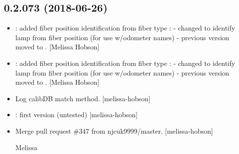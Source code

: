 \documentclass[a4paper,10pt,english]{report}
\begin{document}
\subsection{0.2.073 (2018-06-26)}
\label{\detokenize{misc/changelog:id411}}\begin{itemize}
\item {} 
: added fiber position identification from fiber
type : - changed to identify lamp from
fiber position (for use w/odometer names) - previous version moved to
. {[}Melissa Hobson{]}

\item {} 
: added fiber position identification from fiber
type : - changed to identify lamp from
fiber position (for use w/odometer names) - previous version moved to
. {[}Melissa Hobson{]}

\item {} 
Log calibDB match method. {[}melissa-hobson{]}

\item {} 
: first version (untested) {[}melissa-hobson{]}

\item {} 
Merge pull request \#347 from njcuk9999/master. {[}melissa-hobson{]}

Melissa

\end{itemize}
\end{document}
